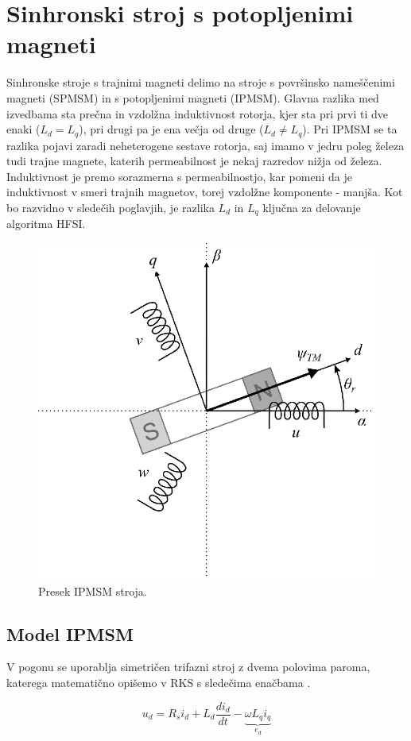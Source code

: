 \documentclass[a4paper,twoside,openright,12pt,slovene]{book}
\begin{document}
\chapter{Sinhronski stroj s potopljenimi magneti} \label{sinhronskiStroj}

Sinhronske stroje s trajnimi magneti delimo na stroje s površinsko nameščenimi magneti (SPMSM) in s potopljenimi magneti (IPMSM). Glavna razlika med izvedbama sta prečna in vzdolžna induktivnost rotorja, kjer sta pri prvi ti dve enaki ($L_d = L_q$), pri drugi pa je ena večja od druge ($L_d \neq L_q$). Pri IPMSM se ta razlika pojavi zaradi neheterogene sestave rotorja, saj
imamo v jedru poleg železa tudi trajne magnete, katerih permeabilnost je nekaj razredov nižja od železa. Induktivnost je premo sorazmerna s permeabilnostjo, kar pomeni da je
induktivnost v smeri trajnih magnetov, torej vzdolžne komponente - manjša. Kot bo razvidno v sledečih poglavjih, je razlika $L_d$ in $L_q$ ključna za delovanje algoritma HFSI. 

\begin{figure}[!htbp]
    \centering
    \includegraphics[width=0.5\columnwidth]{Slike/Inkscape/IPMSMsimple.eps}
    \caption{\label{IPMSM} Presek IPMSM stroja.}
\end{figure}


\section{Model IPMSM} \label{motor}

V pogonu se uporablja simetričen trifazni stroj z dvema polovima paroma, katerega matematično opišemo v RKS s sledečima enačbama \cite{ambrovzivc2016elektrivcni}.

\begin{equation} \label{motorModelD}
    u_d = R_si_d+L_d\frac{di_d}{dt}-\underbrace{\omega L_qi_q}_{e_d}
\end{equation}
\end{document}
